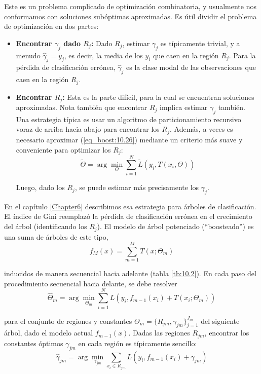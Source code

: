 Este es un problema complicado de optimización combinatoria, y usualmente nos conformamos con soluciones subóptimas aproximadas. Es útil dividir el problema de optimización en dos partes:
\begin{itemize}
    \item \textbf{Encontrar $\gamma_j$ dado $R_j$:} Dado $R_j$, estimar $\gamma_j$ es típicamente trivial, y a menudo $\hat{\gamma}_j = \bar{y}_j$, es decir, la media de los $y_i$ que caen en la región $R_j$. Para la pérdida de clasificación errónea, $\hat{\gamma}_j$ es la clase modal de las observaciones que caen en la región $R_j$.
    \item \textbf{Encontrar $R_j$:} Esta es la parte difícil, para la cual se encuentran soluciones aproximadas. Nota también que encontrar $R_j$ implica estimar $\gamma_j$ también. Una estrategia típica es usar un algoritmo de particionamiento recursivo voraz de arriba hacia abajo para encontrar los $R_j$. Además, a veces es necesario aproximar (\ref{eq_boost:10.26}) mediante un criterio más suave y conveniente para optimizar los $R_j$:
    \begin{equation}
    \tilde{\Theta} = \arg\min_{\Theta} \sum_{i=1}^{N} \tilde{L}(y_i, T(x_i, \Theta))
    \label{eq_boost:10.27}
    \end{equation}
    
    Luego, dado los $R_j$, se puede estimar más precisamente los $\gamma_j$.
\end{itemize}

En el capítulo \ref{Chapter6} describimos esa estrategia para árboles de clasificación. El índice de Gini reemplazó la pérdida de clasificación errónea en el crecimiento del árbol (identificando los $R_j$). El modelo de árbol potenciado (``boosteado'') es una suma de árboles de este tipo,
\begin{equation}
f_M(x) = \sum_{m=1}^{M} T(x; \Theta_m)
\label{eq_boost:10.28}
\end{equation}

\noindent inducidos de manera secuencial hacia adelante (tabla \ref{tb:10.2}). En cada paso del procedimiento secuencial hacia delante, se debe resolver
\begin{equation}
\hat{\Theta}_m = \arg\min_{\Theta_m} \sum_{i=1}^{N} L(y_i, f_{m-1}(x_i) + T(x_i; \Theta_m))
\label{eq_boost:10.29}
\end{equation}

\noindent para el conjunto de regiones y constantes $\Theta_m = \{R_{jm}, \gamma_{jm}\}_{j=1}^{J_m}$ del siguiente árbol, dado el modelo actual $f_{m-1}(x)$. Dadas las regiones $R_{jm}$, encontrar los constantes óptimos $\gamma_{jm}$ en cada región es típicamente sencillo:
\begin{equation}
\hat{\gamma}_{jm} = \arg\min_{\gamma_{jm}} \sum_{x_i \in R_{jm}} L(y_i, f_{m-1}(x_i) + \gamma_{jm})
\label{eq_boost:10.30}
\end{equation}

